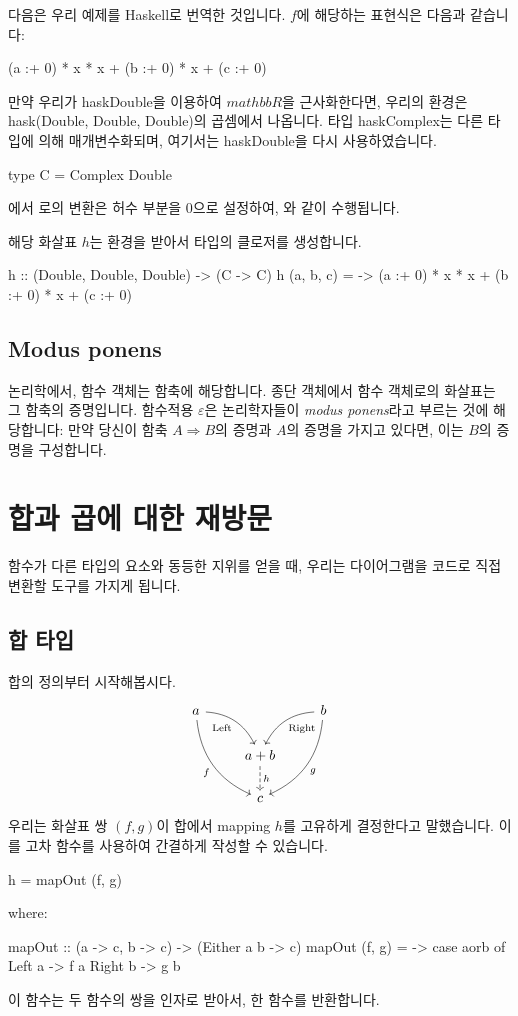 \documentclass[DaoFP]{subfiles}
\begin{document}
다음은 우리 예제를 Haskell로 번역한 것입니다. $f$에 해당하는 표현식은 다음과 같습니다:
\begin{haskell}
(a :+ 0) * x * x + (b :+ 0) * x + (c :+ 0)
\end{haskell}
만약 우리가 hask{Double}을 이용하여 $mathbb{R}$을 근사화한다면, 우리의 환경은 hask{(Double, Double, Double)}의 곱셈에서 나옵니다. 타입 hask{Complex}는 다른 타입에 의해 매개변수화되며, 여기서는 hask{Double}을 다시 사용하였습니다.
\begin{haskell}
type C = Complex Double
\end{haskell}
에서 로의 변환은 허수 부분을 0으로 설정하여, 와 같이 수행됩니다.

해당 화살표 $h$는 환경을 받아서  타입의 클로저를 생성합니다.
\begin{haskell}
h :: (Double, Double, Double) -> (C -> C)
h (a, b, c) = \x -> (a :+ 0) * x * x + (b :+ 0) * x + (c :+ 0)
\end{haskell}

\subsection{Modus ponens}

논리학에서, 함수 객체는 함축에 해당합니다. 종단 객체에서 함수 객체로의 화살표는 그 함축의 증명입니다. 함수적용 $\varepsilon$은 논리학자들이 \emph{modus ponens}라고 부르는 것에 해당합니다: 만약 당신이 함축 $A \Rightarrow B$의 증명과 $A$의 증명을 가지고 있다면, 이는 $B$의 증명을 구성합니다.

\section{합과 곱에 대한 재방문}

함수가 다른 타입의 요소와 동등한 지위를 얻을 때, 우리는 다이어그램을 코드로 직접 변환할 도구를 가지게 됩니다.

\subsection{합 타입}

합의 정의부터 시작해봅시다.
\[
 \begin{tikzcd}
 a
 \arrow[dr,  bend left, "\text{Left}"']
 \arrow[ddr, bend right, "f"']
 && b
 \arrow[dl, bend right, "\text{Right}"]
 \arrow[ddl, bend left, "g"]
 \\
&a + b
\arrow[d, dashed, "h"]
\\
& c
 \end{tikzcd}
\]
우리는 화살표 쌍 $(f, g)$이 합에서 mapping $h$를 고유하게 결정한다고 말했습니다. 이를 고차 함수를 사용하여 간결하게 작성할 수 있습니다.
\begin{haskell}
h = mapOut (f, g)
\end{haskell}
where:
\begin{haskell}
mapOut :: (a -> c, b -> c) -> (Either a b -> c)
mapOut (f, g) = \aorb -> case aorb of
                         Left  a -> f a
                         Right b -> g b
\end{haskell}
이 함수는 두 함수의 쌍을 인자로 받아서, 한 함수를 반환합니다. 
\end{document}
